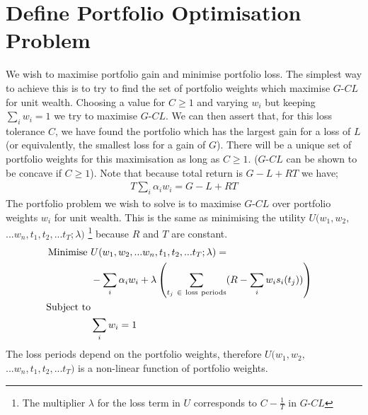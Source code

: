 \documentclass[12pt]{article}
\begin{document}
\section{Define Portfolio Optimisation Problem}
We wish to maximise portfolio gain and minimise portfolio loss. The simplest way to achieve this is to try to
find the set of portfolio weights which maximise $G$-$C L$ for unit wealth. Choosing a value for
$C \ge 1$ and varying $w_i$
but keeping $\sum_i w_i = 1$ we try to maximise $G$-$C L$. We can then assert that, for this loss tolerance $C$, we have found the 
portfolio which has the largest gain for a loss of $L$ (or equivalently, the smallest loss for a gain of $G$).
There will be a unique set of portfolio weights for this maximisation as long as $C\ge1$. ($G$-$C L$
can be shown to be concave if $C\ge1$). Note that because total return is $G-L+RT$ we have;
\begin{eqnarray}
    T\sum_i \alpha_i w_i = G-L+RT
\end{eqnarray}
The portfolio problem we wish to solve is to maximise $G$-$C L$ over portfolio weights $w_i$ for unit wealth.
This is the same as minimising the utility $U(w_1,w_2,$ $...w_n,t_1,t_2,...t_T;\lambda)$
\footnote{The multiplier $\lambda$ for the loss term in $U$ corresponds to $C-\frac{1}{T}$ in $G$-$CL$} because $R$ and $T$ are constant.
\begin{align*}
    {\rm Minimise}\ & U(w_1,w_2,...w_n,t_1,t_2,...t_T;\lambda)=\quad\cr \quad  & -\sum_i \alpha_i w_i + \lambda \left( \sum_{t_j\ \in\ \rm loss\ periods}( R-\sum_i w_i s_i(t_j) )\right)\cr
    {\rm Subject\ to}\cr & \sum_i w_i  = 1
\end{align*}
The
loss periods depend on the portfolio weights, therefore $U(w_1,w_2,$ $...w_n,t_1,t_2,...t_T)$ is a non-linear function of portfolio weights.
\end{document}
